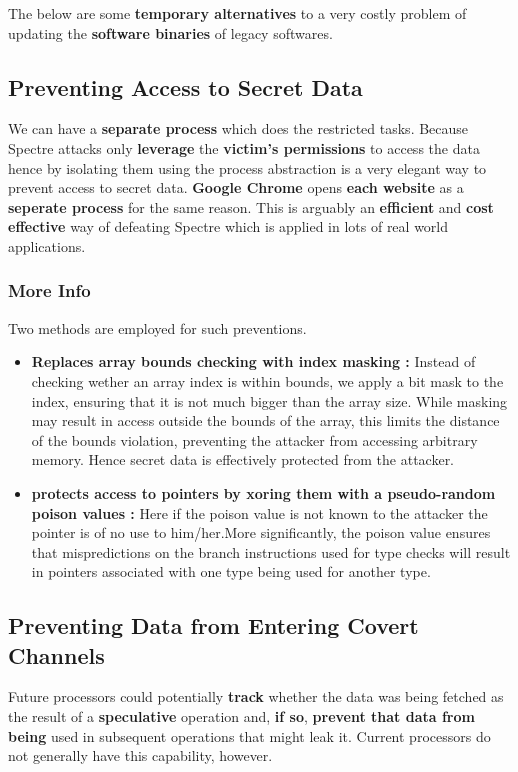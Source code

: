 \documentclass[12pt]{article}
\begin{document}
The below are some \textbf{temporary alternatives} to a very costly problem of updating the \textbf{software binaries} of legacy softwares.
\subsection{Preventing Access to Secret Data}
We can have a \textbf{separate process} which does the restricted tasks. Because Spectre attacks only \textbf{leverage} the \textbf{victim’s permissions} to access the data hence by isolating them using the process abstraction is a very elegant way to prevent access to secret data. \textbf{Google Chrome} opens \textbf{each website} as a \textbf{seperate process} for the same reason. This is arguably an \textbf{efficient} and \textbf{cost effective} way of defeating Spectre which is applied in lots of real world applications.
\subsubsection{More Info}
Two methods are employed for such preventions.
\begin{itemize}
	\item \textbf{Replaces array bounds checking with index masking	:} Instead of checking wether an array index is within bounds, we apply a bit mask to the index, ensuring that it is not much bigger than the array size. While masking may result in access outside the bounds of the array, this limits the distance of the bounds violation, preventing the attacker from accessing arbitrary memory. Hence secret data is effectively protected from the attacker.
	\item \textbf{protects access to pointers by xoring them with a pseudo-random poison values	:} Here if the poison value is not known to the attacker the pointer is of no use to him/her.More significantly, the poison value ensures that mispredictions on the branch instructions used for type checks will result in pointers associated with one type being used for another type.
\end{itemize}
\subsection{Preventing Data from Entering Covert Channels}
Future processors could potentially \textbf{track} whether the data was being
fetched as the result of a \textbf{speculative} operation and, \textbf{if so},
\textbf{prevent that data from being} used in subsequent operations
that might leak it. Current processors do not generally have
this capability, however.
\end{document}
